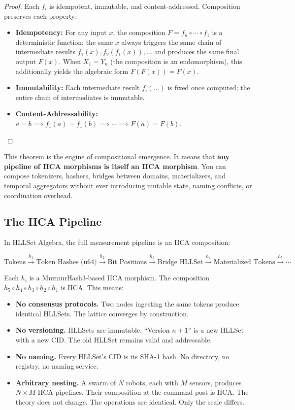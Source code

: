 \documentclass[11pt,a4paper]{article}
\theoremstyle{remark}
\begin{document}
\begin{proof}
Each $f_i$ is idempotent, immutable, and content-addressed. Composition preserves each
property:
\begin{itemize}[leftmargin=*,nosep]
  \item \textbf{Idempotency:} For any input $x$, the composition
    $F = f_n \circ \cdots \circ f_1$ is a deterministic function: the same $x$ always
    triggers the same chain of intermediate results $f_1(x), f_2(f_1(x)), \ldots$ and
    produces the same final output $F(x)$.  When $X_1 = Y_n$ (the composition is an
    endomorphism), this additionally yields the algebraic form $F(F(x)) = F(x)$.
  \item \textbf{Immutability:} Each intermediate result $f_i(\ldots)$ is fixed once
    computed; the entire chain of intermediates is immutable.
  \item \textbf{Content-Addressability:} $a = b \implies f_1(a) = f_1(b) \implies
    \cdots \implies F(a) = F(b)$.
\end{itemize}
\end{proof}

This theorem is the engine of compositional emergence. It means that \textbf{any
pipeline of IICA morphisms is itself an IICA morphism}. You can compose tokenizers,
hashers, bridges between domains, materializers, and temporal aggregators without
ever introducing mutable state, naming conflicts, or coordination overhead.

\subsection{The IICA Pipeline}

In HLLSet Algebra, the full measurement pipeline is an IICA composition:

\begin{equation}
  \text{Tokens} \xrightarrow{h_1} \text{Token Hashes (u64)}
  \xrightarrow{h_2} \text{Bit Positions} \xrightarrow{h_3} \text{Bridge HLLSet}
  \xrightarrow{h_4} \text{Materialized Tokens} \xrightarrow{h_5} \cdots
\end{equation}

Each $h_i$ is a MurmurHash3-based IICA morphism. The composition $h_5 \circ h_4 \circ
h_3 \circ h_2 \circ h_1$ is IICA. This means:
\begin{itemize}[leftmargin=*,nosep]
  \item \textbf{No consensus protocols.} Two nodes ingesting the same tokens produce
    identical HLLSets. The lattice converges by construction.
  \item \textbf{No versioning.} HLLSets are immutable. ``Version $n+1$'' is a new
    HLLSet with a new CID. The old HLLSet remains valid and addressable.
  \item \textbf{No naming.} Every HLLSet's CID is its SHA-1 hash. No directory, no
    registry, no naming service.
  \item \textbf{Arbitrary nesting.} A swarm of $N$ robots, each with $M$ sensors,
    produces $N \times M$ IICA pipelines. Their composition at the command post is IICA.
    The theory does not change. The operations are identical. Only the scale differs.
\end{itemize}
\end{document}
